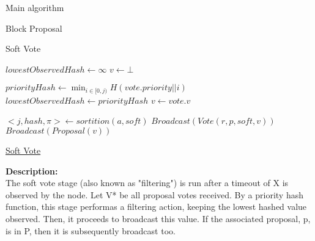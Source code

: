 \documentclass[10pt,a4paper]{article}
\begin{document}
\begin{section}{Main algorithm}
\begin{subsection}{Block Proposal}
\end{subsection}
\begin{subsection}{Soft Vote}\label{ssect:softvote}

\begin{algorithm}[H]
    \begin{algorithmic}[1]
    \State $lowestObservedHash \gets \infty$
    \State $v \gets \bot$ 


        \State $priorityHash \gets \min_{i \in [0, j)} H(vote.priority || i)$
            \State $lowestObservedHash \gets priorityHash$
            \State $v \gets vote.v$
        \EndIf    
    \EndFor

        \State $<j, hash, \pi> \gets sortition(a, soft)$
            \State $Broadcast(Vote(r, p, soft, v))$
                \State $Broadcast(Proposal(v))$
            \EndIf
        \EndIf
    \EndFor

    \EndFunction
    \end{algorithmic}
    \caption{\underline{Soft Vote}}
\end{algorithm}


\noindent \textbf{Description:}\\
The soft vote stage (also known as "filtering") is run after a timeout of X is observed by the node.
Let V* be all proposal votes received. By a priority hash function, this stage performas a filtering action,
keeping the lowest hashed value observed.
Then, it proceeds to broadcast this value.
If the associated proposal, p, is in P, then it is subsequently broadcast too.

\end{subsection}
    

\end{section}
\end{document}

